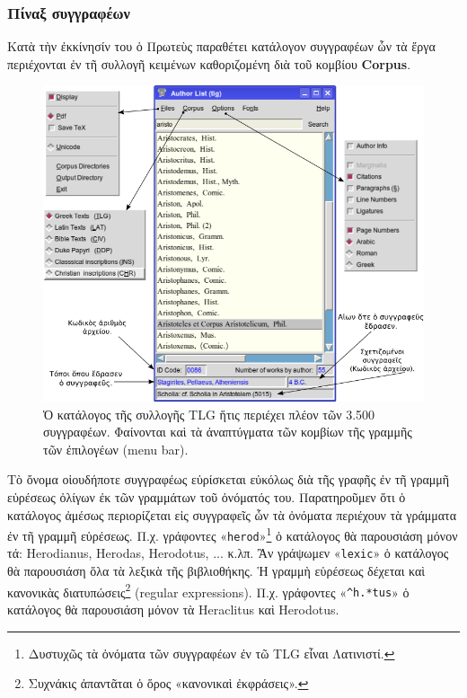 \documentclass[12pt,a4paper]{article}
\begin{document}
    \subsubsection*{Πίναξ συγγραφέων}
      Κατὰ τὴν ἐκκίνησίν του ὁ Πρωτεὺς παραθέτει
      κατάλογον συγγραφέων ὧν τὰ ἔργα περιέχονται ἐν τῆ συλλογῆ κειμένων
      καθοριζομένη διὰ τοῦ κομβίου {\bf Corpus}.
          \begin{figure}[htp]
            \begin{center}
              \includegraphics[scale=0.7]{../images/author-gr.png}
              \caption{Ὁ κατάλογος τῆς συλλογῆς TLG ἥτις
                      περιέχει πλέον τῶν 3.500 συγγραφέων.
                      Φαίνονται καὶ τὰ ἀναπτύγματα τῶν κομβίων
                      τῆς γραμμῆς τῶν ἐπιλογέων ({\small menu bar}).}
            \end{center}
          \end{figure}
    Τὸ ὄνομα οἱουδήποτε συγγραφέως εὑρίσκεται εὐκόλως διὰ τῆς γραφῆς ἐν τῆ
    γραμμῆ εὑρέσεως ὀλίγων ἐκ τῶν γραμμάτων τοῦ ὀνόματός του. Παρατηροῦμεν ὅτι ὁ
    κατάλογος ἀμέσως περιορίζεται εἰς συγγραφεῖς ὧν τὰ ὀνόματα περιέχουν τὰ
    γράμματα ἐν τῆ γραμμῆ εὑρέσεως.
    Π.χ. γράφοντες «{\tt herod}»\footnote{Δυστυχῶς τὰ ὀνόματα τῶν συγγραφέων
    ἐν τῶ TLG εἶναι Λατινιστί.} ὁ κατάλογος θὰ παρουσιάση μόνον τά:
    Herodianus, Herodas, Herodotus, ... κ.λπ.
    Ἂν γράψωμεν «{\tt lexic}» ὁ κατάλογος θὰ παρουσιάση ὅλα τὰ λεξικὰ τῆς
    βιβλιοθήκης.
    Ἡ γραμμὴ εὑρέσεως δέχεται καὶ κανονικὰς διατυπώσεις\footnote{Συχνάκις
    ἀπαντᾶται ὁ ὅρος «κανονικαὶ ἐκφράσεις».} (regular expressions).
    Π.χ. γράφοντες «{\tt \textasciicircum{}h.*tus}» ὁ κατάλογος θὰ  παρουσιάση
    μόνον τὰ Heraclitus καὶ Herodotus.
\end{document}
